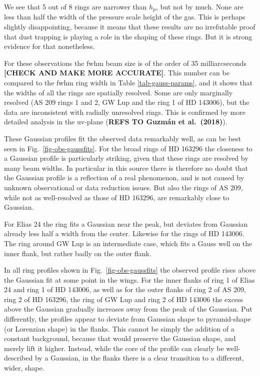 \documentclass{aa}
\begin{document}
We see that 5 out of 8 rings are narrower than $h_p$, but not by much. None are
less than half the width of the pressure scale height of the gas. This is
perhaps slightly disappointing, because it means that these results are no
irrefutable proof that dust trapping is playing a role in the shaping of these
rings. But it is strong evidence for that nonetheless.

For these observations the fwhm beam size is of the order of 35 milliarcseconds
{\bf [CHECK AND MAKE MORE ACCURATE]}. This number can be compared to the fwhm
ring width in Table \ref{tab-gauss-params}, and it shows that the widths of all
the rings are spatially resolved. Some are only marginally resolved (AS 209
rings 1 and 2, GW Lup and the ring 1 of HD 143006), but the data are
inconsistent with radially unresolved rings. This is confirmed by more detailed
analysis in the uv-plane ({\bf REFS TO Guzm\'an et al.~(2018)}).

These Gaussian profiles fit the observed data remarkably well, as can be
best seen in Fig.~\ref{fig-obs-gaussfits}. 
For the broad rings of HD 163296 the closeness to a Gaussian profile is
particularly striking, given that these rings are resolved by many beam
widths. In particular in this source there is therefore no doubt that the
Gaussian profile is a reflection of a real phenomenon, and is not caused by
unknown observational or data reduction issues.  But also the rings of AS 209,
while not as well-resolved as those of HD 163296, are remarkably close to
Gaussian.

For Elias 24 the ring fits a Gaussian near the peak, but deviates from Gaussian
already less half a width from the center. Likewise for the rings of HD
143006. The ring around GW Lup is an intermediate case, which fits a Gauss well
on the inner flank, but rather badly on the outer flank.

In all ring profiles shown in Fig.~\ref{fig-obs-gaussfits} the observed profile
rises above the Gaussian fit at some point in the wings. For the inner flanks of
ring 1 of Elias 24 and ring 1 of HD 143006, as well as for the outer flanks of
ring 2 of AS 209, ring 2 of HD 163296, the ring of GW Lup and ring 2 of HD
143006 the excess above the Gaussian gradually increases away from the peak of
the Gaussian. Put differently, the profiles appear to deviate from Gaussian
shape to pyramid-shape (or Lorenzian shape) in the flanks. This cannot be simply
the addition of a constant background, because that would preserve the Gaussian
shape, and merely lift it higher. Instead, while the core of the profile can clearly
be well-described by a Gaussian, in the flanks there is a clear transition
to a different, wider, shape.
\end{document}
